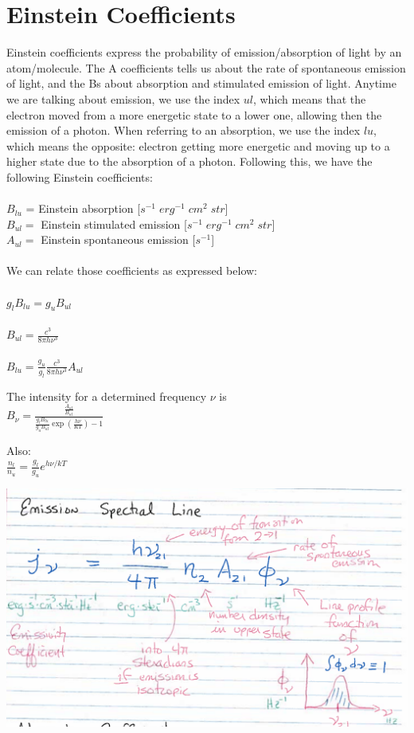\section{Einstein Coefficients}

Einstein coefficients express the probability of emission/absorption of light by an atom/molecule. The A coefficients tells us about the rate of spontaneous emission of light, and the Bs about absorption and stimulated emission of light. Anytime we are talking about emission, we use the index $ul$, which means that the electron moved from a more energetic state to a lower one, allowing then the emission of a photon. When referring to an absorption, we use the index $lu$, which means the opposite: electron getting more energetic and moving up to a higher state due to the absorption of a photon. Following this, we have the following Einstein coefficients:
\\
\\$B_{lu}$ = Einstein absorption [$s^{-1}\;erg^{-1}\;cm^2\;str$]
\\$B_{ul} =$ Einstein stimulated emission [$s^{-1}\;erg^{-1}\;cm^2\;str$]
\\$A_{ul} =$ Einstein spontaneous emission [$s^{-1}$]
\\
\\We can relate those coefficients as expressed below:
\\
\\$g_lB_{lu} = g_u B_{ul}$
\\
\\$B_{ul} = \frac{c^3}{8\pi h \nu^3}$
\\
\\$B_{lu} = \frac{g_u}{g_l} \frac{c^3}{8\pi h \nu^3} A_{ul}$


The intensity for a determined frequency $\nu$ is
\\$B_{\nu} = \frac{\frac{A_{ul}}{B_{ul}}}{\frac{g_l B_{lu}}{g_u B_{ul}} \exp{(\frac{h\nu}{KT})}-1}$

Also:
\\$\frac{n_l}{n_u} = \frac{g_l}{g_u}e^{h\nu/kT}$


\includegraphics[scale=.5]{emission.png}

